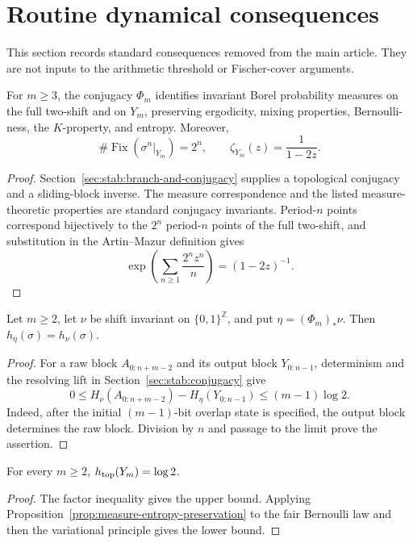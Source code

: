 \section{Routine dynamical consequences}\label{sec:supp-routine-dynamics}

This section records standard consequences removed from the main article.
They are not inputs to the arithmetic threshold or Fischer-cover arguments.

\begin{proposition}
\label{prop:conjugacy-consequences}
For $m\ge3$, the conjugacy $\Phi_m$ identifies invariant Borel probability
measures on the full two-shift and on $Y_m$, preserving ergodicity, mixing
properties, Bernoulli-ness, the $K$-property, and entropy.  Moreover,
\[
\#\operatorname{Fix}(\sigma^n|_{Y_m})=2^n,
\qquad
\zeta_{Y_m}(z)=\frac1{1-2z}.
\]
\end{proposition}

\begin{proof}
Section~\ref{sec:stab:branch-and-conjugacy} supplies a topological conjugacy and a
sliding-block inverse.  The measure correspondence and the listed
measure-theoretic properties are standard conjugacy invariants.  Period-$n$
points correspond bijectively to the $2^n$ period-$n$ points of the full
two-shift, and substitution in the Artin--Mazur definition gives
\[
\exp\left(\sum_{n\ge1}\frac{2^nz^n}{n}\right)=(1-2z)^{-1}.
\]
\end{proof}

\begin{proposition}
\label{prop:measure-entropy-preservation}
Let $m\ge2$, let $\nu$ be shift invariant on $\{0,1\}^{\mathbb Z}$, and put
$\eta=(\Phi_m)_*\nu$.  Then $h_\eta(\sigma)=h_\nu(\sigma)$.
\end{proposition}

\begin{proof}
For a raw block $A_{0:n+m-2}$ and its output block $Y_{0:n-1}$,
determinism and the resolving lift in Section~\ref{sec:stab:conjugacy} give
\[
0\le H_\nu(A_{0:n+m-2})-H_\eta(Y_{0:n-1})
\le(m-1)\log2.
\]
Indeed, after the initial $(m-1)$-bit overlap state is specified, the output
block determines the raw block.  Division by $n$ and passage to the limit
prove the assertion.
\end{proof}

\begin{corollary}
\label{cor:entropy-preservation}
For every $m\ge2$, $h_{\rm top}(Y_m)=\log2$.
\end{corollary}

\begin{proof}
The factor inequality gives the upper bound.  Applying
Proposition~\ref{prop:measure-entropy-preservation} to the fair Bernoulli law
and then the variational principle gives the lower bound.
\end{proof}
